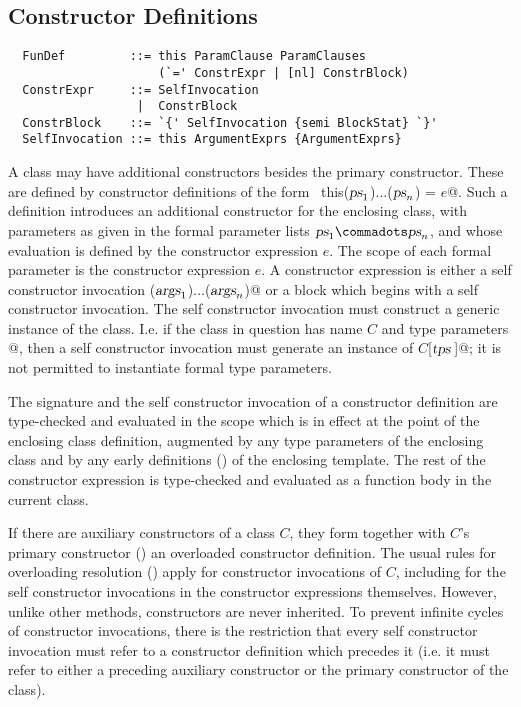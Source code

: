 \subsection{Constructor Definitions}\label{sec:constr-defs}

\syntax\begin{lstlisting}
  FunDef         ::= this ParamClause ParamClauses 
                     (`=' ConstrExpr | [nl] ConstrBlock)
  ConstrExpr     ::= SelfInvocation
                  |  ConstrBlock
  ConstrBlock    ::= `{' SelfInvocation {semi BlockStat} `}'
  SelfInvocation ::= this ArgumentExprs {ArgumentExprs}
\end{lstlisting}

A class may have additional constructors besides the primary
constructor.  These are defined by constructor definitions of the form
~\lstinline@def this($\mbox{\sl ps}_1$)$\ldots$($\mbox{\sl ps}_n$) = $e$@.  Such a
definition introduces an additional constructor for the enclosing
class, with parameters as given in the formal parameter lists $\ps_1
\commadots \ps_n$, and whose evaluation is defined by the constructor
expression $e$.  The scope of each formal parameter is the constructor
expression $e$.  A constructor expression is either a self constructor
invocation \lstinline@this($\mbox{\sl args}_1$)$\ldots$($\mbox{\sl args}_n$)@ or a block
which begins with a self constructor invocation. The self constructor
invocation must construct a generic instance of the class. I.e. if the
class in question has name $C$ and type parameters
\lstinline@[$\tps\,$]@, then a self constructor invocation must
generate an instance of \lstinline@$C$[$\tps\,$]@; it is not permitted
to instantiate formal type parameters.

The signature and the self constructor invocation of a constructor
definition are type-checked and evaluated in the scope which is in
effect at the point of the enclosing class definition, augmented by
any type parameters of the enclosing class and by any early
definitions () of the enclosing template.
The rest of the
constructor expression is type-checked and evaluated as a function
body in the current class.
  
If there are auxiliary constructors of a class $C$, they form together
with $C$'s primary constructor ()
an overloaded constructor
definition. The usual rules for overloading resolution
() apply for constructor invocations of $C$,
including for the self constructor invocations in the constructor
expressions themselves. However, unlike other methods, constructors
are never inherited.  To prevent infinite cycles of constructor
invocations, there is the restriction that every self constructor
invocation must refer to a constructor definition which precedes it
(i.e. it must refer to either a preceding auxiliary constructor or the
primary constructor of the class).  

